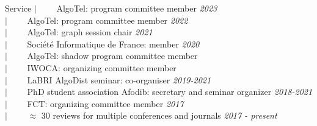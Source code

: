 \documentclass[french]{resume} %
\begin{document}
	\begin{rSection}{Service} %
		$| \qquad$ AlgoTel: program committee member \hfill {\em 2023} \\
		$| \qquad$ AlgoTel: program committee member \hfill {\em 2022} \\
		$| \qquad$ AlgoTel: graph session chair \hfill {\em 2021} \\
		$| \qquad$ Société Informatique de France: member \hfill {\em 2020} \\
		$| \qquad$ AlgoTel: shadow program committee member \\
		$| \qquad$ IWOCA: organizing committee member \\
		$| \qquad$ LaBRI AlgoDist seminar: co-organiser \hfill {\em 2019-2021}\\
		$| \qquad$ PhD student association Afodib: secretary and seminar organizer \hfill {\em 2018-2021}\\
		$| \qquad$ FCT: organizing committee member \hfill {\em 2017}\\
		$| \qquad$ $\approx$ 30 reviews for multiple conferences and journals \hfill {\em 2017 - present}\\
	\end{rSection}
\end{document}
